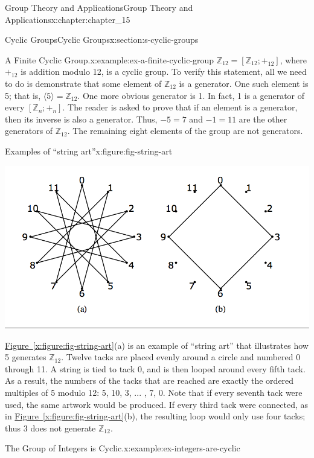 \documentclass[oneside,10pt,]{book}
\newcommand{\xreffont}{\relax}
\numberwithin{equation}{section}
\begin{document}
\begin{chapterptx}{Group Theory and Applications}{}{Group Theory and Applications}{}{}{x:chapter:chapter_15}
\begin{sectionptx}{Cyclic Groups}{}{Cyclic Groups}{}{}{x:section:s-cyclic-groups}
\begin{example}{A Finite Cyclic Group.}{x:example:ex-a-finite-cyclic-group}
\(\mathbb{Z}_{12} = [\mathbb{Z}_{12}; +_{12} ]\),  where \(+_{12}\) is addition modulo 12, is a cyclic group. To verify this statement, all we need to do is demonstrate that some element of \(\mathbb{Z}_{12}\)  is a generator. One such element is 5; that is, \(\langle 5 \rangle = \mathbb{Z}_{12}\). One more obvious generator is 1. In fact, 1 is a generator of every \([\mathbb{Z}_n; +_n]\). The reader is asked to prove that if an element is a generator, then its inverse is also a generator. Thus, \(-5 = 7\) and \(-1 = 11\) are the other generators of \(\mathbb{Z}_{12}\). The remaining eight elements of the group are not generators.%
\begin{figureptx}{Examples of ``string art''}{x:figure:fig-string-art}{}%
\begin{image}{0.15}{0.7}{0.15}%
\includegraphics[width=\linewidth]{images/fig-string-art.png}
\end{image}%
\tcblower
\end{figureptx}%
\hyperref[x:figure:fig-string-art]{Figure~{\xreffont\ref{x:figure:fig-string-art}}}(a)  is an example of ``string art'' that illustrates how 5 generates \(\mathbb{Z}_{12}\). Twelve tacks are placed evenly around a circle and numbered 0 through 11. A string is tied to tack 0, and is then looped around every fifth tack. As a result, the numbers of the tacks that are reached are exactly the ordered multiples of 5 modulo 12: 5, 10, 3, ... , 7, 0.  Note that if every seventh tack were used, the same artwork would be produced. If every third tack were connected, as in \hyperref[x:figure:fig-string-art]{Figure~{\xreffont\ref{x:figure:fig-string-art}}}(b), the resulting loop would only use four tacks; thus 3 does not generate \(\mathbb{Z}_{12}\).%
\end{example}
\begin{example}{The Group of Integers is Cyclic.}{x:example:ex-integers-are-cyclic}%

\end{example}
\end{sectionptx}
\end{chapterptx}
\end{document}
